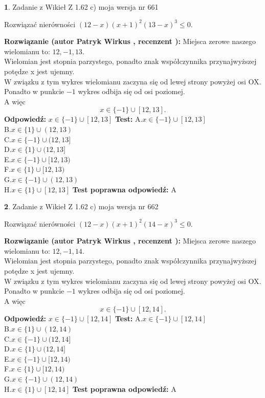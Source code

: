 \documentclass[12pt, a4paper]{article}
\theoremstyle{definition} %
\newtheorem{zad}{}
\newcommand{\zadStart}[1]{\begin{zad}#1\newline}
\newcommand{\zadStop}{\end{zad}}
\newcommand{\rozwStart}[2]{\noindent \textbf{Rozwiązanie (autor #1 , recenzent #2): }\newline}
\newcommand{\rozwStop}{\newline}
\newcommand{\odpStart}{\noindent \textbf{Odpowiedź:}\newline}
\newcommand{\odpStop}{\newline}
\newcommand{\testStart}{\noindent \textbf{Test:}\newline}
\newcommand{\testStop}{\newline}
\newcommand{\kluczStart}{\noindent \textbf{Test poprawna odpowiedź:}\newline}
\newcommand{\kluczStop}{\newline}
\begin{document}
\zadStart{Zadanie z Wikieł Z 1.62 c) moja wersja nr 661}

Rozwiązać nierówności $(12-x)(x+1)^{2}(13-x)^{3}\le0$.
\zadStop
\rozwStart{Patryk Wirkus}{}
Miejsca zerowe naszego wielomianu to: $12, -1, 13$.\\
Wielomian jest stopnia parzystego, ponadto znak współczynnika przy\linebreak najwyższej potędze x jest ujemny.\\ W związku z tym wykres wielomianu zaczyna się od lewej strony powyżej osi OX.\\
Ponadto w punkcie $-1$ wykres odbija się od osi poziomej.\\
A więc $$x \in \{-1\} \cup [12,13].$$
\rozwStop
\odpStart
$x \in \{-1\} \cup [12,13]$
\odpStop
\testStart
A.$x \in \{-1\} \cup [12,13]$\\
B.$x \in \{1\} \cup (12,13)$\\
C.$x \in \{-1\} \cup (12,13]$\\
D.$x \in \{1\} \cup (12,13]$\\
E.$x \in \{-1\} \cup [12,13)$\\
F.$x \in \{1\} \cup [12,13)$\\
G.$x \in \{-1\} \cup (12,13)$\\
H.$x \in \{1\} \cup [12,13]$
\testStop
\kluczStart
A
\kluczStop



\zadStart{Zadanie z Wikieł Z 1.62 c) moja wersja nr 662}

Rozwiązać nierówności $(12-x)(x+1)^{2}(14-x)^{3}\le0$.
\zadStop
\rozwStart{Patryk Wirkus}{}
Miejsca zerowe naszego wielomianu to: $12, -1, 14$.\\
Wielomian jest stopnia parzystego, ponadto znak współczynnika przy\linebreak najwyższej potędze x jest ujemny.\\ W związku z tym wykres wielomianu zaczyna się od lewej strony powyżej osi OX.\\
Ponadto w punkcie $-1$ wykres odbija się od osi poziomej.\\
A więc $$x \in \{-1\} \cup [12,14].$$
\rozwStop
\odpStart
$x \in \{-1\} \cup [12,14]$
\odpStop
\testStart
A.$x \in \{-1\} \cup [12,14]$\\
B.$x \in \{1\} \cup (12,14)$\\
C.$x \in \{-1\} \cup (12,14]$\\
D.$x \in \{1\} \cup (12,14]$\\
E.$x \in \{-1\} \cup [12,14)$\\
F.$x \in \{1\} \cup [12,14)$\\
G.$x \in \{-1\} \cup (12,14)$\\
H.$x \in \{1\} \cup [12,14]$
\testStop
\kluczStart
A
\kluczStop
\end{document}
